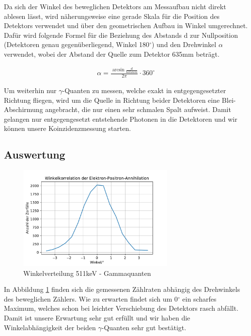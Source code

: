 \documentclass[11pt]{scrartcl}
\begin{document}
Da sich der Winkel des beweglichen Detektors am Messaufbau nicht direkt ablesen lässt, wird näherungsweise eine gerade Skala für die Position des Detektors verwendet und über den geometrischen Aufbau in Winkel umgerechnet. Dafür wird folgende Formel für die Beziehung des Abstands d zur Nullposition (Detektoren genau gegenüberliegend, Winkel 180$^\circ$) und den Drehwinkel $\alpha$ verwendet, wobei der Abstand der Quelle zum Detektor 635mm beträgt. 

\begin{align}
\alpha=\frac{\arcsin{\frac{d}{635mm}}}{2\pi}\cdot 360^\circ
\end{align}

Um weiterhin nur $\gamma$-Quanten zu messen, welche exakt in entgegengesetzter Richtung fliegen, wird um die Quelle in Richtung beider Detektoren eine Blei-Abschirmung angebracht, die nur einen sehr schmalen Spalt aufweist. Damit gelangen nur entgegengesetzt entstehende Photonen in die Detektoren und wir können unsere Koinzidenzmessung starten. 

\subsection{Auswertung}

\begin{figure}[htbp]  
     \includegraphics[width=0.7\textwidth]{Winkelkorrelation_der_Elektron-Positron-Annihilation.pdf}
  \caption{Winkelverteilung 511keV - Gammaquanten}
  \label{511}
\end{figure}

In Abbildung \ref{511} finden sich die gemessenen Zählraten abhängig des Drehwinkels des beweglichen Zählers. Wie zu erwarten findet sich um 0$^\circ$ ein scharfes Maximum, welches schon bei leichter Verschiebung des Detektors rasch abfällt. Damit ist unsere Erwartung sehr gut erfüllt und wir haben die Winkelabhängigkeit der beiden $\gamma$-Quanten sehr gut bestätigt. 
\end{document}
